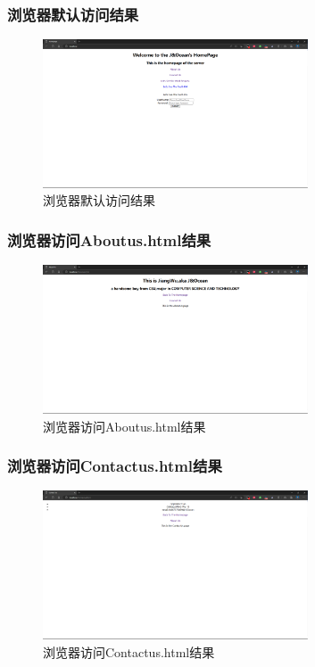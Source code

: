 \documentclass[UTF8,12pt]{article}
\begin{document}
\subsubsection{浏览器默认访问结果}
\begin{figure}[htbp]
    \centering
    \includegraphics[width=0.7\textwidth]{img/5.png}
    \caption{浏览器默认访问结果}
\end{figure}

\newpage

\subsubsection{浏览器访问Aboutus.html结果}
\begin{figure}[htbp]
    \centering
    \includegraphics[width=0.7\textwidth]{img/6.png}
    \caption{浏览器访问Aboutus.html结果}
\end{figure}

\subsubsection{浏览器访问Contactus.html结果}
\begin{figure}[htbp]
    \centering
    \includegraphics[width=0.7\textwidth]{img/7.png}
    \caption{浏览器访问Contactus.html结果}
\end{figure}
\end{document}
